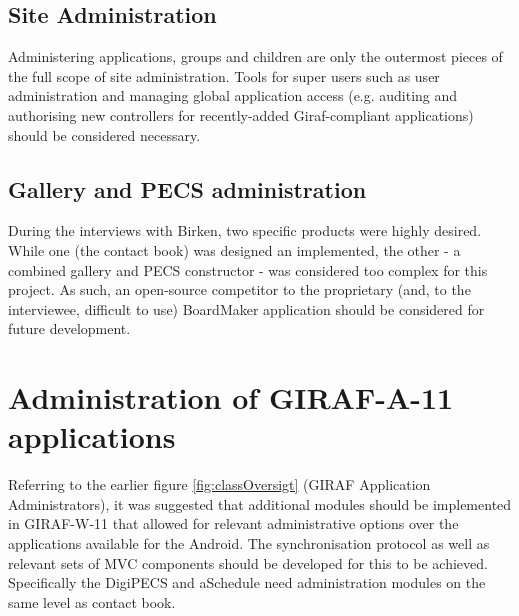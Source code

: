 \subsection*{Site Administration}
Administering applications, groups and children are only the outermost pieces of the full scope of site administration. Tools for super users such as user administration and managing global application access (e.g. auditing and authorising new controllers for recently-added Giraf-compliant applications) should be considered necessary.

\subsection*{Gallery and PECS administration}
During the interviews with Birken, two specific products were highly desired. While one (the contact book) was designed an implemented, the other - a combined gallery and PECS constructor - was considered too complex for this project. As such, an open-source competitor to the proprietary (and, to the interviewee, difficult to use) BoardMaker application should be considered for future development.

\section{Administration of GIRAF-A-11 applications}
Referring to the earlier figure \vref{fig:classOversigt} (GIRAF Application Administrators), it was suggested that additional modules should be implemented in GIRAF-W-11 that allowed for relevant administrative options over the applications available for the Android. The synchronisation protocol as well as relevant sets of MVC components should be developed for this to be achieved.
Specifically the DigiPECS and aSchedule need administration modules on the same level as contact book.


